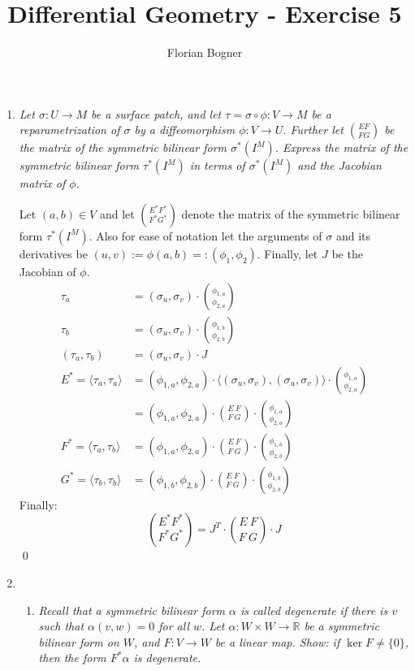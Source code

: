 \documentclass[a4paper,11pt,notitlepage,fullpage]{article}
\begin{document}
\author{Florian Bogner}
\title{Differential Geometry - Exercise 5}
\maketitle

\begin{enumerate}
\item \emph{Let $\sigma: U \to M$ be a surface patch, and let $\tau = \sigma \circ \phi: V \to M$ be a reparametrization of $\sigma$ by a diffeomorphism $\phi: V \to U$. Further let $\binom{EF}{FG}$ be the matrix of the symmetric bilinear form $\sigma^*(I^M)$. Express the matrix of the symmetric bilinear form $\tau^*(I^M)$ in terms of $\sigma^*(I^M)$ and the Jacobian matrix of $\phi$.}

Let $(a,b) \in V$ and let $\binom{E^*F^*}{F^*G^*}$ denote the matrix of the symmetric bilinear form $\tau^*(I^M)$. Also for ease of notation let the arguments of $\sigma$ and its derivatives be $(u,v) := \phi(a, b) =: (\phi_1, \phi_2)$. Finally, let $J$ be the Jacobian of $\phi$.
\begin{align*}
\tau_a &= (\sigma_u, \sigma_v) \cdot \binom{\phi_{1,a}}{\phi_{2,a}} \\
\tau_b &= (\sigma_u, \sigma_v) \cdot \binom{\phi_{1,b}}{\phi_{2,b}} \\
(\tau_a, \tau_b) &= (\sigma_u, \sigma_v) \cdot J \\
E^* = \langle\tau_a, \tau_a\rangle &= (\phi_{1,a},\phi_{2,a}) \cdot \langle(\sigma_u, \sigma_v),(\sigma_u, \sigma_v)\rangle \cdot \binom{\phi_{1,a}}{\phi_{2,a}} \\
&= (\phi_{1,a},\phi_{2,a}) \cdot \binom{E~F}{F~G} \cdot \binom{\phi_{1,a}}{\phi_{2,a}} \\
F^* = \langle\tau_a, \tau_b\rangle &= (\phi_{1,a},\phi_{2,a}) \cdot \binom{E~F}{F~G} \cdot \binom{\phi_{1,b}}{\phi_{2,b}} \\
G^* = \langle\tau_b, \tau_b\rangle &= (\phi_{1,b},\phi_{2,b}) \cdot \binom{E~F}{F~G} \cdot \binom{\phi_{1,b}}{\phi_{2,b}}
\end{align*}
Finally:
\begin{equation*}
\binom{E^*F^*}{F^*G^*} = J^T \cdot \binom{E~F}{F~G} \cdot J
\end{equation*}
\qed

\item
\begin{enumerate}
\item \emph{Recall that a symmetric bilinear form $\alpha$ is called degenerate if there is
$v$ such that $\alpha(v,w) = 0$ for all $w$. Let $\alpha: W \times W \to \mathbb R$ be a symmetric
bilinear form on $W$, and $F : V \to W$ be a linear map. Show: if
$\ker F \neq \{0\}$, then the form $F^*\alpha$ is degenerate.}


\end{enumerate}
\end{enumerate}
\end{document}
